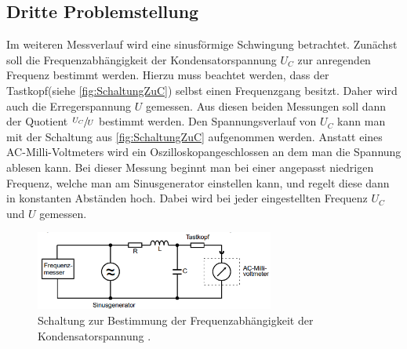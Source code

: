 \subsection{Dritte Problemstellung}
Im weiteren Messverlauf wird eine sinusförmige Schwingung betrachtet. Zunächst soll die Frequenzabhängigkeit der Kondensatorspannung $U_{C}$ zur anregenden Frequenz bestimmt 
werden. Hierzu muss beachtet werden, dass der Tastkopf(siehe \autoref{fig:SchaltungZuC}) selbst einen Frequenzgang besitzt. Daher wird auch die Erregerspannung $U$ gemessen.
Aus diesen beiden Messungen soll dann der Quotient $\sfrac{U_{C}}{U}$ bestimmt werden. Den Spannungsverlauf von  $U_{C}$ kann man mit der Schaltung aus \autoref{fig:SchaltungZuC}
aufgenommen werden. Anstatt eines AC-Milli-Voltmeters wird ein Oszilloskopangeschlossen an dem man die Spannung ablesen kann. Bei dieser Messung beginnt man bei einer angepasst
niedrigen Frequenz, welche man am Sinusgenerator einstellen kann, und regelt diese dann in konstanten Abständen hoch. Dabei wird bei jeder eingestellten Frequenz $U_{C}$ und 
$U$ gemessen. 
\begin{figure}
    \centering
    \includegraphics[width=0.7\textwidth]{content/SchaltungZuC.pdf}
    \caption{Schaltung zur Bestimmung der Frequenzabhängigkeit der Kondensatorspannung \cite{v354}.}    
    \label{fig:SchaltungZuC}
\end{figure}

